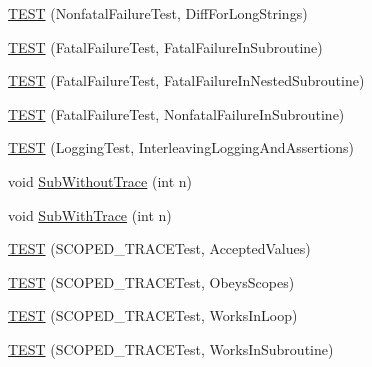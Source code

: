 \begin{DoxyCompactItemize}
\item 
\mbox{\hyperlink{_obj__test_2lib_2googletest-master_2googletest_2test_2googletest-output-test___8cc_aaa6c1704a62b7412fd5e053614f47650}{T\+E\+ST}} (Nonfatal\+Failure\+Test, Diff\+For\+Long\+Strings)
\item 
\mbox{\hyperlink{_obj__test_2lib_2googletest-master_2googletest_2test_2googletest-output-test___8cc_a6076f79ee5f9e8982bba181cbbebb0ed}{T\+E\+ST}} (Fatal\+Failure\+Test, Fatal\+Failure\+In\+Subroutine)
\item 
\mbox{\hyperlink{_obj__test_2lib_2googletest-master_2googletest_2test_2googletest-output-test___8cc_a8763e3844bd21de9bd7126658a4279c5}{T\+E\+ST}} (Fatal\+Failure\+Test, Fatal\+Failure\+In\+Nested\+Subroutine)
\item 
\mbox{\hyperlink{_obj__test_2lib_2googletest-master_2googletest_2test_2googletest-output-test___8cc_afe609aef34a68a2ab9809eb48112c5cc}{T\+E\+ST}} (Fatal\+Failure\+Test, Nonfatal\+Failure\+In\+Subroutine)
\item 
\mbox{\hyperlink{_obj__test_2lib_2googletest-master_2googletest_2test_2googletest-output-test___8cc_ad9bbf46060935b29c42d3116ddbc3566}{T\+E\+ST}} (Logging\+Test, Interleaving\+Logging\+And\+Assertions)
\item 
void \mbox{\hyperlink{_obj__test_2lib_2googletest-master_2googletest_2test_2googletest-output-test___8cc_a7e222b468bbde7215ce826f10993e746}{Sub\+Without\+Trace}} (int n)
\item 
void \mbox{\hyperlink{_obj__test_2lib_2googletest-master_2googletest_2test_2googletest-output-test___8cc_a543ee38e0824e47113bb12c3277e09ae}{Sub\+With\+Trace}} (int n)
\item 
\mbox{\hyperlink{_obj__test_2lib_2googletest-master_2googletest_2test_2googletest-output-test___8cc_a81f7d012241339866fccb3c3750b553b}{T\+E\+ST}} (S\+C\+O\+P\+E\+D\+\_\+\+T\+R\+A\+C\+E\+Test, Accepted\+Values)
\item 
\mbox{\hyperlink{_obj__test_2lib_2googletest-master_2googletest_2test_2googletest-output-test___8cc_a82f82f6a7caa426cccf8d20113f897c0}{T\+E\+ST}} (S\+C\+O\+P\+E\+D\+\_\+\+T\+R\+A\+C\+E\+Test, Obeys\+Scopes)
\item 
\mbox{\hyperlink{_obj__test_2lib_2googletest-master_2googletest_2test_2googletest-output-test___8cc_a46dcedbe67765adaebc7740ee17a88de}{T\+E\+ST}} (S\+C\+O\+P\+E\+D\+\_\+\+T\+R\+A\+C\+E\+Test, Works\+In\+Loop)
\item 
\mbox{\hyperlink{_obj__test_2lib_2googletest-master_2googletest_2test_2googletest-output-test___8cc_a492695898501cea9f99ccd690c2b3991}{T\+E\+ST}} (S\+C\+O\+P\+E\+D\+\_\+\+T\+R\+A\+C\+E\+Test, Works\+In\+Subroutine)

\end{DoxyCompactItemize}
